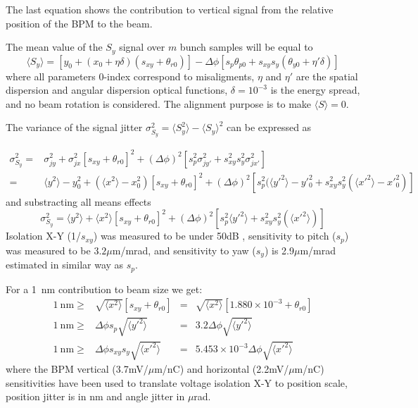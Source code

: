 The last equation shows the contribution to vertical signal from the relative position of the BPM to the beam.\par
The mean value of the $S_y$ signal over $m$ bunch samples will be equal to
\begin{equation}
 \langle S_y\rangle = [y_0+(x_0+\eta\delta)(s_{xy}+\theta_{r0})]-\Delta\phi[s_p\theta_{p0}+s_{xy}s_y(\theta_{y0}+\eta'\delta)]
\end{equation}
where all parameters 0-index correspond to misaligments, $\eta$ and $\eta'$ are the spatial dispersion and angular dispersion optical functions, $\delta=10^{-3}$ is the energy spread, and no beam rotation is considered. The alignment purpose is to make $\langle S\rangle =0$.\par
The variance of the signal jitter $\sigma_{S_y}^2=\langle S_y^2\rangle-\langle S_y\rangle^2$ can be expressed as\par
\begin{align*}
 \sigma_{S_y}^2=&\sigma_{jy}^2+\sigma_{jx}^2[s_{xy}+\theta_{r0}]^2+(\Delta\phi)^2[s_p^2\sigma_{jy'}^2+s_{xy}^2s_y^2\sigma_{jx'}^2]\\
 =&\langle y^2\rangle-y_0^2+(\langle x^2\rangle-x_0^2)[s_{xy}+\theta_{r0}]^2+(\Delta\phi)^2[s_p^2(\langle y'^2\rangle-y'^2_0 +s_{xy}^2s_y^2(\langle x'^2\rangle-x'^2_0)]
\end{align*}
and substracting all means effects
\begin{equation}
 \sigma_{S_y}^2=\langle y^2\rangle+\langle x^2\rangle[s_{xy}+\theta_{r0}]^2+(\Delta\phi)^2[s_p^2\langle y'^2\rangle+s_{xy}^2s_y^2(\langle x'^2\rangle)]
\end{equation}
Isolation X-Y (1/$s_{xy}$) was measured to be under 50dB%
, sensitivity to pitch ($s_p$) was measured to be $3.2\mu$m/mrad, and sensitivity to yaw ($s_y$) is 2.9$\mu$m/mrad estimated in similar way as $s_p$.\par
For a 1~nm contribution to beam size we get:
\begin{align}
 1~\text{nm}\geq &\sqrt{\langle x^2\rangle}[s_{xy}+\theta_{r0}]&=&\sqrt{\langle x^2\rangle}[1.880\times10^{-3}+\theta_{r0}]\\
 1~\text{nm}\geq &\Delta\phi s_p\sqrt{\langle y'^2\rangle}&=& 3.2\Delta\phi\sqrt{\langle y'^2\rangle}\\
 1~\text{nm}\geq &\Delta\phi s_{xy}s_y\sqrt{\langle x'^2\rangle}&=&5.453\times10^{-3}\Delta\phi\sqrt{\langle x'^2\rangle}
\end{align}
where  the BPM vertical (3.7mV/$\mu$m/nC) and horizontal (2.2mV/$\mu$m/nC) sensitivities have been used to translate voltage isolation X-Y to position scale, position jitter is in nm and angle jitter in $\mu$rad.\par
